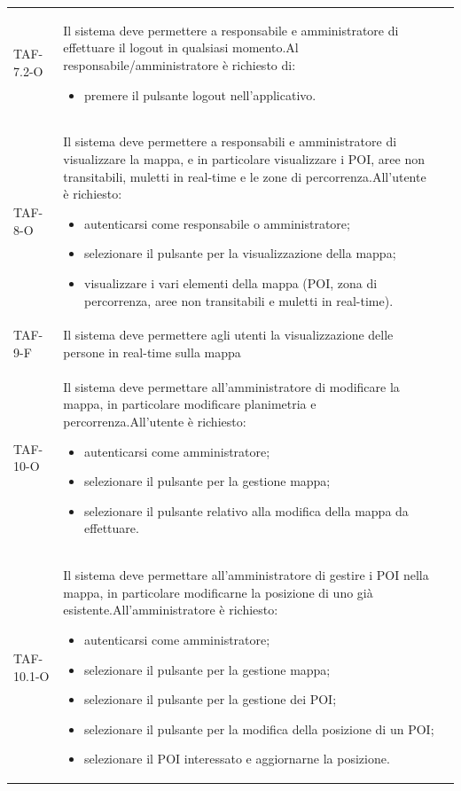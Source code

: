 \begin{longtable}{ >{\centering}p{} >{}p{}
		>{\centering}p{}}
	TAF-7.2-O & Il sistema deve permettere a responsabile e amministratore di effettuare il logout in qualsiasi momento.\newline Al responsabile/amministratore è richiesto di: \begin{itemize} \item premere il pulsante logout nell'applicativo. \end{itemize} & 0\tabularnewline
	
	TAF-8-O & Il sistema deve permettere a responsabili e amministratore di visualizzare la mappa, e in particolare visualizzare i POI, aree non transitabili, muletti in real-time e le zone di percorrenza.\newline All'utente è richiesto:\begin{itemize} \item autenticarsi come responsabile o amministratore; \item selezionare il pulsante per la visualizzazione della mappa; \item visualizzare i vari elementi della mappa (POI, zona di percorrenza, aree non transitabili e muletti in real-time). \end{itemize} & 0\tabularnewline
	
	TAF-9-F & Il sistema deve permettere agli utenti la visualizzazione delle persone in real-time sulla mappa & 0\tabularnewline
	
	TAF-10-O & Il sistema deve permettare all'amministratore di modificare la mappa, in particolare modificare planimetria e percorrenza.\newline All'utente è richiesto: \begin{itemize} \item autenticarsi come amministratore; \item selezionare il pulsante per la gestione mappa; \item selezionare il pulsante relativo alla modifica della mappa da effettuare.\end{itemize} & 0\tabularnewline
	
	TAF-10.1-O & Il sistema deve permettare all'amministratore di gestire i POI nella mappa, in particolare modificarne la posizione di uno già esistente.\newline All'amministratore è richiesto: \begin{itemize}\item autenticarsi come amministratore; \item selezionare il pulsante per la gestione mappa; \item selezionare il pulsante per la gestione dei POI; \item selezionare il pulsante per la modifica della posizione di un POI; \item selezionare il POI interessato e aggiornarne la posizione.\end{itemize} & 0\tabularnewline
	

\end{longtable}
